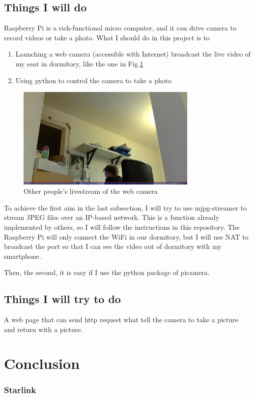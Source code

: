 \documentclass{article}
\begin{document}
\subsection{Things I will do}
Raspberry Pi is a rich-functional micro computer, and it can drive camera to record videos or take a photo. What I should do in this project is to 
\begin{enumerate}
    \item Launching a web camera (accessible with Internet) broadcast the live video of my seat in dormitory, like the one in Fig.\ref{webcam}
    \item Using python to control the camera to take a photo
\end{enumerate}
\begin{figure}[htbp]
    \centering
    \includegraphics[keepaspectratio,width=250pt]{webcam.jpg}
    \caption{Other people's livestream of the web camera}\label{webcam}
\end{figure}
To achieve the first aim in the last subsection, I will try to use mjpg-streamer\cite{mjpg-streamer} to stream JPEG files over an IP-based network. This is a function already implemented by others, so I will follow the instructions in this repository. The Raspberry Pi will only connect the WiFi in our dormitory, but I will use NAT to broadcast the port so that I can see the video out of dormitory with my smartphone.

Then, the second, it is easy if I use the python package of picamera.
\subsection{Things I will try to do}
A web page that can send http request what tell the camera to take a picture and return with a picture.\cite{web_picam}

\section{Conclusion}
\subsubsection*{Starlink}
\end{document}

